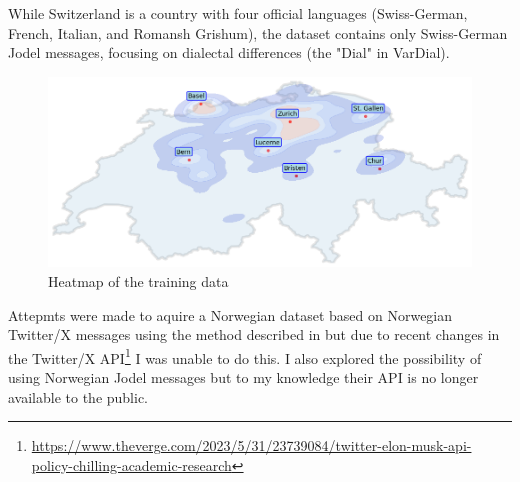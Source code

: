 While Switzerland is a country with four official languages (Swiss-German, French, Italian, and Romansh Grishum), the dataset contains only Swiss-German Jodel messages, focusing on dialectal differences (the "Dial" in VarDial). %

\begin{figure}
    \centering
    \includegraphics[width=\textwidth]{./figs/heatmap.png}
    \caption{Heatmap of the training data}
    \label{fig:heatmap}
\end{figure}

Attepmts were made to aquire a Norwegian dataset based on Norwegian Twitter/X messages using the method described in \cite{ljubesicTweetGeoToolCollecting2016} but due to recent changes in the Twitter/X API\footnote{\url{https://www.theverge.com/2023/5/31/23739084/twitter-elon-musk-api-policy-chilling-academic-research}} I was unable to do this. I also explored the possibility of using Norwegian Jodel messages but to my knowledge their API is no longer available to the public.